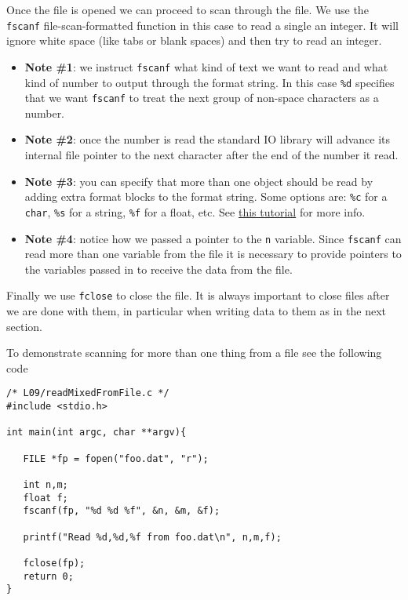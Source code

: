 Once the file is opened we can proceed to scan through the file. We use the \texttt{fscanf} file-scan-formatted function in this case to read a single an integer. It will ignore white space (like tabs or blank spaces) and then try to read an integer. 

\begin{itemize}
\item[] {\bf Note \#1}: we instruct \texttt{fscanf} what kind of text we want to read and what kind of number to output through the format string. In this case \texttt{\%d} specifies that we want \texttt{fscanf} to treat the next group of non-space characters as a number. 

\item[]{\bf Note \#2}: once the number is read the standard IO library will advance its internal file pointer to the next character after the end of the number it read.

\item[]{\bf Note \#3}: you can specify that more than one object should be read by adding extra format blocks to the format string. Some options are: \texttt{\%c} for a \texttt{char}, \texttt{\%s} for a string, \texttt{\%f} for a float, etc. See \href{https://www.tutorialspoint.com/c_standard_library/c_function_fscanf.htm}{this tutorial} for more info.

\item[]{\bf Note \#4}: notice how we passed a pointer to the \texttt{n} variable. Since \texttt{fscanf} can read more than one variable from the file it is necessary to provide pointers to the variables passed in to receive the data from the file.
\end{itemize}

Finally we use \texttt{fclose} to close the file. It is always important to close files after we are done with them, in particular when writing data to them as in the next section.

To demonstrate scanning for more than one thing from a file see the following code

\begin{verbatim}
/* L09/readMixedFromFile.c */
#include <stdio.h>

int main(int argc, char **argv){
  
   FILE *fp = fopen("foo.dat", "r");
   
   int n,m;
   float f;
   fscanf(fp, "%d %d %f", &n, &m, &f);
   
   printf("Read %d,%d,%f from foo.dat\n", n,m,f);
   
   fclose(fp);
   return 0;
}
\end{verbatim}

